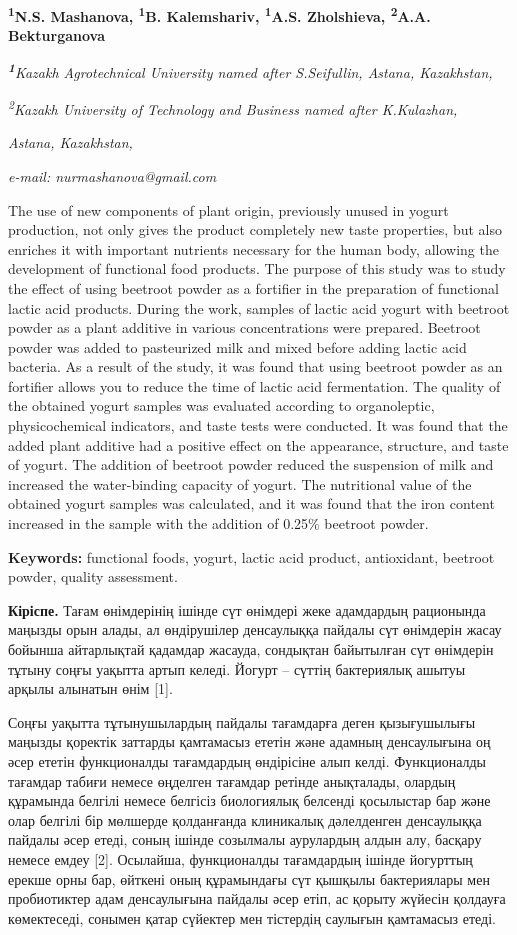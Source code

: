 {\bfseries \textsuperscript{1}N.S. Mashanova, \textsuperscript{1}B.
Kalemshariv, \textsuperscript{1}A.S. Zholshieva, \textsuperscript{2}A.A.
Bekturganova}

\emph{{\bfseries \textsuperscript{1}}Kazakh Agrotechnical University named
after S.Seifullin, Astana, Kazakhstan,}

\emph{\textsuperscript{2}Kazakh University of Technology and Business
named after K.Kulazhan,}

\emph{Astana, Kazakhstan,}

\emph{e-mail: nurmashanova@gmail.com}

The use of new components of plant origin, previously unused in yogurt
production, not only gives the product completely new taste properties,
but also enriches it with important nutrients necessary for the human
body, allowing the development of functional food products. The purpose
of this study was to study the effect of using beetroot powder as a
fortifier in the preparation of functional lactic acid products. During
the work, samples of lactic acid yogurt with beetroot powder as a plant
additive in various concentrations were prepared. Beetroot powder was
added to pasteurized milk and mixed before adding lactic acid bacteria.
As a result of the study, it was found that using beetroot powder as an
fortifier allows you to reduce the time of lactic acid fermentation. The
quality of the obtained yogurt samples was evaluated according to
organoleptic, physicochemical indicators, and taste tests were
conducted. It was found that the added plant additive had a positive
effect on the appearance, structure, and taste of yogurt. The addition
of beetroot powder reduced the suspension of milk and increased the
water-binding capacity of yogurt. The nutritional value of the obtained
yogurt samples was calculated, and it was found that the iron content
increased in the sample with the addition of 0.25\% beetroot powder.

{\bfseries Keywords:} functional foods, yogurt, lactic acid product,
antioxidant, beetroot powder, quality assessment.

{\bfseries Кіріспе.} Тағам өнімдерінің ішінде сүт өнімдері жеке адамдардың
рационында маңызды орын алады, ал өндірушілер денсаулыққа пайдалы сүт
өнімдерін жасау бойынша айтарлықтай қадамдар жасауда, сондықтан
байытылған сүт өнімдерін тұтыну соңғы уақытта артып келеді. Йогурт --
сүттің бактериялық ашытуы арқылы алынатын өнім {[}1{]}.

Соңғы уақытта тұтынушылардың пайдалы тағамдарға деген қызығушылығы
маңызды қоректік заттарды қамтамасыз ететін және адамның денсаулығына оң
әсер ететін функционалды тағамдардың өндірісіне алып келді. Функционалды
тағамдар табиғи немесе өңделген тағамдар ретінде анықталады, олардың
құрамында белгілі немесе белгісіз биологиялық белсенді қосылыстар бар
және олар белгілі бір мөлшерде қолданғанда клиникалық дәлелденген
денсаулыққа пайдалы әсер етеді, соның ішінде созылмалы аурулардың алдын
алу, басқару немесе емдеу {[}2{]}. Осылайша, функционалды тағамдардың
ішінде йогурттың ерекше орны бар, өйткені оның құрамындағы сүт қышқылы
бактериялары мен пробиотиктер адам денсаулығына пайдалы әсер етіп, ас
қорыту жүйесін қолдауға көмектеседі, сонымен қатар сүйектер мен
тістердің саулығын қамтамасыз етеді.

